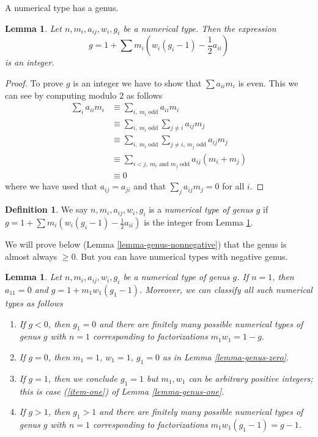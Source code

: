 \documentclass{stacks-project}
\theoremstyle{plain}
\newtheorem{lemma}[subsection]{Lemma}
\theoremstyle{definition}
\newtheorem{definition}[subsection]{Definition}
\theoremstyle{remark}
\numberwithin{equation}{subsection}
\begin{document}
\noindent
A numerical type has a genus.

\begin{lemma}
\label{lemma-genus}
Let $n, m_i, a_{ij}, w_i, g_i$ be a numerical type. Then the expression
$$
g = 1 + \sum m_i(w_i(g_i - 1) - \frac{1}{2} a_{ii})
$$
is an integer.
\end{lemma}

\begin{proof}
To prove $g$ is an integer we have to show that $\sum a_{ii}m_i$ is even.
This we can see by computing modulo $2$ as follows
\begin{align*}
\sum\nolimits_i a_{ii} m_i 
& \equiv
\sum\nolimits_{i,\ m_i\text{ odd}} a_{ii}m_i \\
& \equiv
\sum\nolimits_{i,\ m_i\text{ odd}} \sum\nolimits_{j \not = i} a_{ij}m_j \\
& \equiv
\sum\nolimits_{i,\ m_i\text{ odd}}
\sum\nolimits_{j \not = i,\ m_j\text{ odd}} a_{ij}m_j \\
& \equiv
\sum\nolimits_{i < j,\ m_i\text{ and }m_j\text{ odd}} a_{ij}(m_i + m_j) \\
& \equiv
0
\end{align*}
where we have used that $a_{ij} = a_{ji}$ and that $\sum_j a_{ij}m_j = 0$
for all $i$.
\end{proof}

\begin{definition}
\label{definition-genus}
We say $n, m_i, a_{ij}, w_i, g_i$ is a {\it numerical type of genus $g$}
if $g = 1 + \sum m_i(w_i(g_i - 1) - \frac{1}{2} a_{ii})$ is the integer
from Lemma \ref{lemma-genus}.
\end{definition}

\noindent
We will prove below (Lemma \ref{lemma-genus-nonnegative}) that the genus
is almost always $\geq 0$. But you can have numerical types with
negative genus.

\begin{lemma}
\label{lemma-irreducible}
Let $n, m_i, a_{ij}, w_i, g_i$ be a numerical type of genus $g$.
If $n = 1$, then $a_{11} = 0$ and $g = 1 + m_1w_1(g_1 - 1)$.
Moreover, we can classify all such numerical types as follows
\begin{enumerate}
\item If $g < 0$, then $g_1 = 0$ and there are finitely many possible
numerical types of genus $g$ with $n = 1$ corresponding to factorizations
$m_1w_1 = 1 - g$.
\item If $g = 0$, then $m_1 = 1$, $w_1 = 1$, $g_1 = 0$
as in Lemma \ref{lemma-genus-zero}.
\item If $g = 1$, then we conclude $g_1 = 1$ but $m_1, w_1$ can be arbitrary
positive integers; this is case
(\ref{item-one}) of Lemma \ref{lemma-genus-one}.
\item If $g > 1$, then $g_1 > 1$ and there are finitely many possible
numerical types of genus $g$ with $n = 1$ corresponding to
factorizations $m_1w_1(g_1 - 1) = g - 1$.
\end{enumerate}
\end{lemma}
\end{document}
